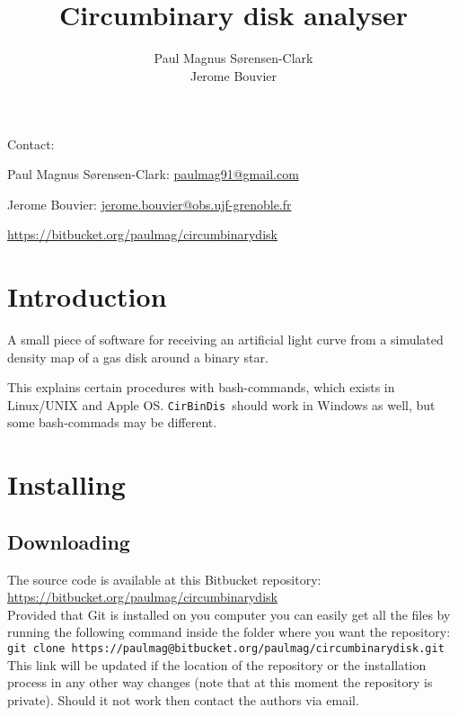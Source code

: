 \documentclass[a4paper, 12pt, english, titlepage]{article}
\title{\sname \\ Circumbinary disk analyser}
\author{Paul Magnus Sørensen-Clark \\ Jerome Bouvier}
\newcommand{\sname}{\texttt{CirBinDis }}
\begin{document}
\maketitle
\tableofcontents

\vfill
Contact:

Paul Magnus Sørensen-Clark:
\href{mailto:paulmag91@gmail.com}{paulmag91@gmail.com}

Jerome Bouvier:
\href{mailto:jerome.bouvier@obs.ujf-grenoble.fr}{jerome.bouvier@obs.ujf-grenoble.fr}

\url{https://bitbucket.org/paulmag/circumbinarydisk}

\clearpage


\section{Introduction}

A small piece of software for receiving an artificial light curve from a simulated density map of a gas disk around a binary star.

This explains certain procedures with bash-commands, which exists in Linux/UNIX and Apple OS. \sname should work in Windows as well, but some bash-commads may be different.


\section{Installing}

\subsection{Downloading}
    The source code is available at this Bitbucket repository: \\
    \url{https://bitbucket.org/paulmag/circumbinarydisk} \\
    Provided that Git is installed on you computer you can easily get all the files by running the following command inside the folder where you want the repository: \\
    \texttt{git clone https://paulmag@bitbucket.org/paulmag/circumbinarydisk.git} \\
    This link will be updated if the location of the repository or the installation process in any other way changes (note that at this moment the repository is private).
    Should it not work then contact the authors via email.
\end{document}
